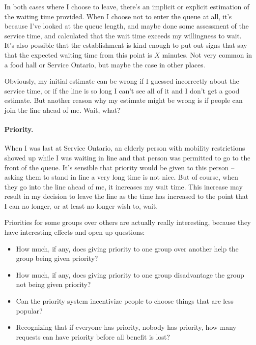 \documentclass[a4paper]{report}
\begin{document}
In both cases where I choose to leave, there's an implicit or explicit estimation of the waiting time provided. When I choose not to enter the queue at all, it's because I've looked at the queue length, and maybe done some assessment of the service time, and calculated that the wait time exceeds my willingness to wait. It's also possible that the establishment is kind enough to put out signs that say that the expected waiting time from this point is $X$ minutes. Not very common in a food hall or Service Ontario, but maybe the case in other places.

Obviously, my initial estimate can be wrong if I guessed incorrectly about the service time, or if the line is so long I can't see all of it and I don't get a good estimate. But another reason why my estimate might be wrong is if people can join the line ahead of me. Wait, what?

\paragraph{Priority.}
When I was last at Service Ontario, an elderly person with mobility restrictions showed up while I was waiting in line and that person was permitted to go to the front of the queue. It's sensible that priority would be given to this person -- asking them to stand in line a very long time is not nice. But of course, when they go into the line ahead of me, it increases my wait time. This increase may result in my decision to leave the line as the time has increased to the point that I can no longer, or at least no longer wish to, wait. 

Priorities for some groups over others are actually really interesting, because they have interesting effects and open up questions:

\begin{itemize}
	\item How much, if any, does giving priority to one group over another help the group being given priority?
	\item How much, if any, does giving priority to one group disadvantage the group not being given priority?
	\item Can the priority system incentivize people to choose things that are less popular?
	\item Recognizing that if everyone has priority, nobody has priority, how many requests can have priority before all benefit is lost?
\end{itemize}
\end{document}
